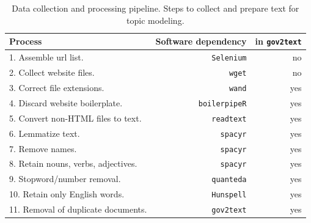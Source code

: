 \documentclass[11pt]{article}
\begin{document}
\begin{table}[ht]
    \centering
    \begin{tabular}{lrr}
        \hline
        Process & Software dependency & in \texttt{gov2text} \\
        \hline
        1. Assemble url list. & \texttt{Selenium} & no \\
        2. Collect website files. & \texttt{wget} & no \\
        3. Correct file extensions. & \texttt{wand} \citep{wand} & yes \\
        4. Discard website boilerplate. & \texttt{boilerpipeR} \citep{boilerpipeR} & yes \\
        5. Convert non-HTML files to text. & \texttt{readtext} \citep{readtext} & yes \\
        6. Lemmatize text. & \texttt{spacyr} \citep{spacyr}& yes \\
        7. Remove names. & \texttt{spacyr} & yes \\
        8. Retain nouns, verbs, adjectives. & \texttt{spacyr} & yes \\
        9. Stopword/number removal. & \texttt{quanteda} \citep{quanteda} & yes \\ 
        10. Retain only English words. & \texttt{Hunspell} \citep{hunspell} & yes \\
        11. Removal of duplicate documents. & \texttt{gov2text} & yes \\
        \hline
    \end{tabular}
    \caption{\label{tab:list} Data collection and processing pipeline. Steps to collect and prepare text for topic modeling.}  \vspace{-.9cm}
\end{table}


\end{document}

